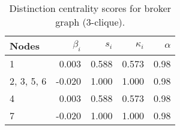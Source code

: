 \begin{table}
\centering
\caption{\label{tab:b3}Distinction centrality scores for broker graph (3-clique).}
\centering
\begin{tabular}[t]{lrrrr}
\toprule
Nodes & $\beta_i$ & $s_i$ & $\kappa_i$ & $\alpha$\\
\midrule
1 & 0.003 & 0.588 & 0.573 & 0.98\\
2, 3, 5, 6 & -0.020 & 1.000 & 1.000 & 0.98\\
4 & 0.003 & 0.588 & 0.573 & 0.98\\
7 & -0.020 & 1.000 & 1.000 & 0.98\\
\bottomrule
\end{tabular}
\end{table}
